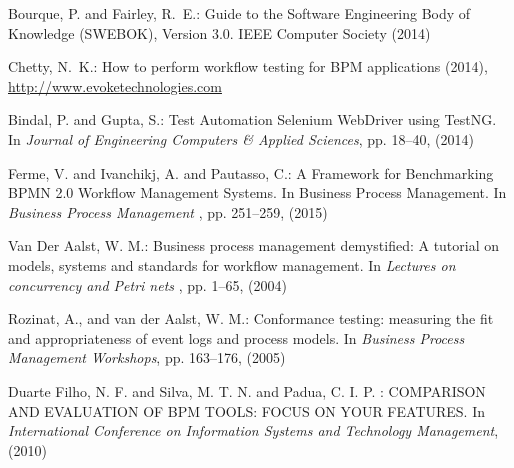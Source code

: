 \documentclass[runningheads,a4paper]{llncs}
\begin{document}
\begin{thebibliography}{4}
Bourque, P. and Fairley, R.~E.: Guide to the Software Engineering Body of Knowledge (SWEBOK), Version 3.0. IEEE Computer Society (2014)

 Chetty, N.~K.: How to perform workflow testing for BPM applications (2014), \url{http://www.evoketechnologies.com}

Bindal, P. and Gupta, S.: Test Automation Selenium WebDriver using TestNG. In {\em Journal of Engineering Computers \& Applied Sciences}, pp.
  18--40, (2014)

Ferme, V. and Ivanchikj, A. and Pautasso, C.: A Framework for Benchmarking BPMN 2.0 Workflow Management Systems. In Business Process Management. In {\em Business Process Management }, pp.
  251--259, (2015)
  
Van Der Aalst, W. M.: Business process management demystified: A tutorial on models, systems and standards for workflow management. In {\em Lectures on concurrency and Petri nets }, pp.
  1--65, (2004)
  
Rozinat, A., and van der Aalst, W. M.: Conformance testing: measuring the fit and appropriateness of event logs and process models. In {\em Business Process Management Workshops}, pp.
  163--176, (2005)
  
Duarte Filho, N. F. and Silva, M. T. N. and Padua, C. I. P. : COMPARISON AND EVALUATION OF BPM TOOLS: FOCUS ON YOUR FEATURES. In {\em International Conference on Information Systems and Technology Management}, (2010)


\end{thebibliography}
\end{document}
